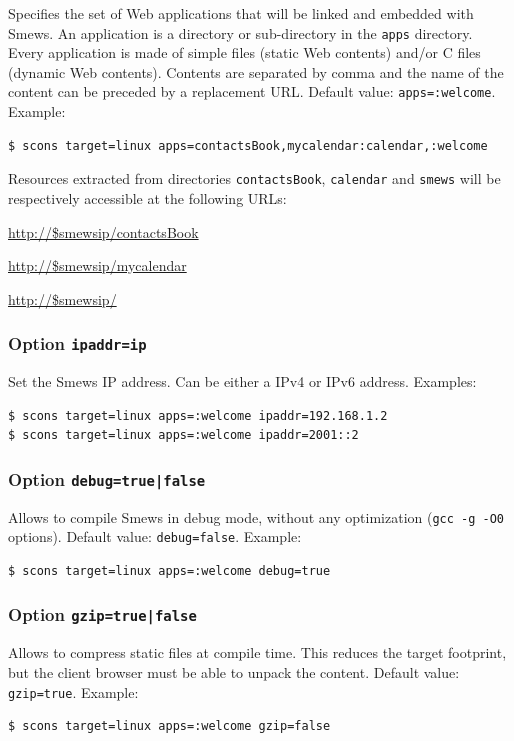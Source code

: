 \documentclass{report}
\begin{document}
Specifies the set of Web applications that will be linked and embedded with Smews. An application is a directory or sub-directory in the \verb+apps+ directory. Every application is made of simple files (static Web contents) and/or C files (dynamic Web contents). Contents are separated by comma and the name of the content can be preceded by a replacement URL. Default value: \verb+apps=:welcome+. Example:
\begin{verbatim}
$ scons target=linux apps=contactsBook,mycalendar:calendar,:welcome
\end{verbatim}

Resources extracted from directories \verb+contactsBook+, \verb+calendar+ and \verb+smews+ will be respectively accessible at the following URLs:

\url{http://$smewsip/contactsBook}

\url{http://$smewsip/mycalendar}

\url{http://$smewsip/}

\subsubsection{Option {\tt ipaddr=ip}}

Set the Smews IP address. Can be either a IPv4 or IPv6 address. Examples:
\begin{verbatim}
$ scons target=linux apps=:welcome ipaddr=192.168.1.2
$ scons target=linux apps=:welcome ipaddr=2001::2
\end{verbatim}

\subsubsection{Option {\tt debug=true|false}}

Allows to compile Smews in debug mode, without any optimization (\verb+gcc -g -O0+ options). Default value: \verb+debug=false+. Example:
\begin{verbatim}
$ scons target=linux apps=:welcome debug=true
\end{verbatim}

\subsubsection{Option {\tt gzip=true|false}}

Allows to compress static files at compile time. This reduces the target footprint, but the client browser must be able to unpack the content. Default value: \verb+gzip=true+. Example:
\begin{verbatim}
$ scons target=linux apps=:welcome gzip=false
\end{verbatim}
\end{document}
